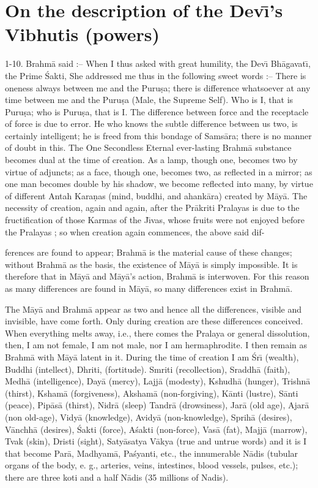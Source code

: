 \chapter{On the description of the Dev\={\i}'s Vibhutis (powers)}

1-10. Brahm\=a said :-- When I thus asked with great humility, the Dev\={\i} Bh\=agavat\={\i}, the Prime \'Sakti, She addressed me thus in the following sweet words :-- There is oneness always between me and the Puru\d{s}a; there is difference whatsoever at any time between me and the Puru\d{s}a (Male, the Supreme Self). Who is I, that is Puru\d{s}a; who is Puru\d{s}a, that is I. The difference between force and the receptacle of force is due to error. He who knows the subtle difference between us two, is certainly intelligent; he is freed from this bondage of Sams\=ara; there is no manner of doubt in this. The One Secondless Eternal ever-lasting Brahm\=a substance becomes dual at the time of creation. As a lamp, though one, becomes two by virtue of adjuncts; as a face, though one, becomes two, as reflected in a mirror; as one man becomes double by his shadow, we become reflected into many, by virtue of different Antah Kara\d{n}as (mind, buddhi, and ahank\=ara) created by M\=ay\=a. The necessity of creation, again and again, after the Pr\=akriti Pralayas is due to the fructification of those Karmas of the J\={\i}vas, whose fruits were not enjoyed before the Pralayas ; so when creation again commences, the above said dif-

ferences are found to appear; Brahm\=a is the material cause of these changes; without Brahm\=a as the basis, the existence of M\=ay\=a is simply impossible. It is therefore that in M\=ay\=a and M\=ay\=a's action, Brahm\=a is interwoven. For this reason as many differences are found in M\=ay\=a, so many differences exist in Brahm\=a.

The M\=ay\=a and Brahm\=a appear as two and hence all the differences, visible and invisible, have come forth. Only during creation are these differences conceived. When everything melts away, i.e., there comes the Pralaya or general dissolution, then, I am not female, I am not male, nor I am hermaphrodite. I then remain as Brahm\=a with M\=ay\=a latent in it. During the time of creation I am \'Sr\={\i} (wealth), Buddhi (intellect), Dhriti, (fortitude). Smriti (recollection), Sraddh\=a (faith), Medh\=a (intelligence), Day\=a (mercy), Lajj\=a (modesty), Kshudh\=a (hunger), Trishn\=a (thirst), Ksham\=a (forgiveness), Aksham\=a (non-forgiving), K\=anti (lustre), S\=anti (peace), Pip\=as\=a (thirst), Nidr\=a (sleep) Tandr\=a (drowsiness), Jar\=a (old age), Ajar\=a (non old-age), Vidy\=a (knowledge), Avidy\=a (non-knowledge), Sprih\=a (desires), V\=anchh\=a (desires), \'Sakti (force), A\'sakti (non-force), Vas\=a (fat), Majj\=a (marrow), Tvak (skin), Dristi (sight), Saty\=asatya V\=akya (true and untrue words) and it is I that become Par\=a, Madhyam\=a, Pa\'syanti, etc., the innumerable N\=adis (tubular organs of the body, e. g., arteries, veins, intestines, blood vessels, pulses, etc.); there are three koti and a half N\=adis (35 millions of Nadis).

